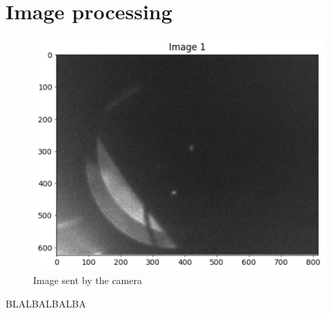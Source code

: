 \section{Image processing}
\begin{figure}[H]
    \centering
    \includegraphics[scale=0.85]{assets/figures/MesuresResultats/ImageSimple.png}
    \caption{Image sent by the camera}
    \label{fig:MES_Ima1}
\end{figure}
BLALBALBALBA
